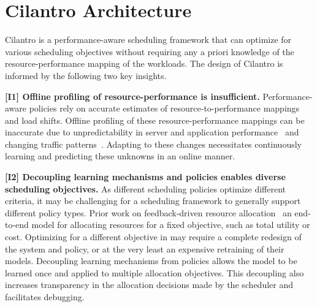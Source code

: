
\section{Cilantro Architecture}
\label{sec:method}

Cilantro is a performance-aware scheduling framework that can optimize for various
scheduling objectives without requiring any a priori knowledge of the resource-performance mapping of the workloads. The design of Cilantro is informed by the following two key insights.

 \noindent\textbf{[I1] Offline profiling of resource-performance is insufficient.} Performance-aware
policies rely on accurate estimates of resource-to-performance mappings and load shifts.
Offline profiling of these resource-performance mappings can be inaccurate due to unpredictability in server and application performance~\cite{tailatscale} and
changing traffic patterns~\cite{googletrace}. 
Adapting to these changes necessitates continuously learning
and predicting these unknowns in an online manner.

\noindent\textbf{[I2] Decoupling learning mechanisms and policies enables diverse scheduling objectives.}
As different
scheduling policies optimize different criteria, it may be challenging for a scheduling
framework to generally support different policy types. Prior work on feedback-driven resource
allocation~\cite{zhang2021sinan, kalavri2018three, qiu2020firm}  an end-to-end model for
allocating resources for a fixed objective, such as total utility or cost.
Optimizing for a different objective in  may require a complete redesign of the system and policy, or at the very least
an expensive retraining of their models.
Decoupling learning mechanisms from policies allows the
model to be learned once and applied to multiple allocation objectives. This decoupling also increases 
transparency in the allocation decisions made by the scheduler and facilitates debugging.

